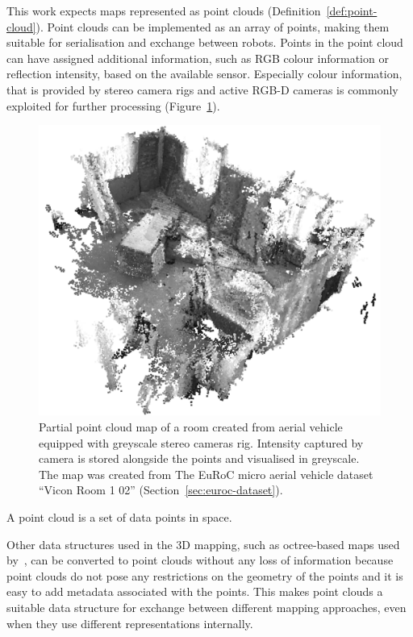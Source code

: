 This work expects maps represented as point clouds (Definition~\ref{def:point-cloud}). Point clouds can be implemented as an array of points, making them suitable for serialisation and exchange between robots. Points in the point cloud can have assigned additional information, such as \gls{RGB} colour information or reflection intensity, based on the available sensor. Especially colour information, that is provided by stereo camera rigs and active \gls{RGB-D} cameras is commonly exploited for further processing (Figure~\ref{fig:v1-greyscale}).

\begin{figure}
    \centering
    \includegraphics[width=\textwidth]{../img/v1-greyscale.png}
    \caption[Point cloud map with greyscale colours]{Partial point cloud map of a room created from aerial vehicle equipped with greyscale stereo cameras rig. Intensity captured by camera is stored alongside the points and visualised in greyscale. The map was created from The EuRoC micro aerial vehicle dataset ``Vicon Room 1 02'' (Section~\ref{sec:euroc-dataset}).}
    \label{fig:v1-greyscale}
\end{figure}

\begin{defn}
\label{def:point-cloud}
A point cloud is a set of data points in space.
\end{defn}

Other data structures used in the \gls{3D} mapping, such as octree-based maps used by~\citet{hornung2013octomap}, can be converted to point clouds without any loss of information because point clouds do not pose any restrictions on the geometry of the points and it is easy to add metadata associated with the points. This makes point clouds a suitable data structure for exchange between different mapping approaches, even when they use different representations internally.

